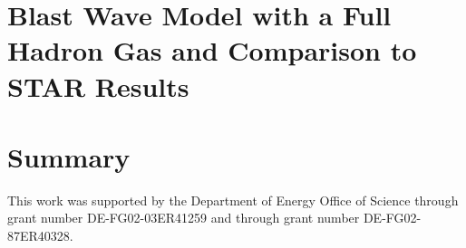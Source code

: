 \documentclass[aps,prc,nofootinbib,showpacs,superscriptaddress,groupedaddress]{revtex4-1}
\begin{document}
%


\section{Blast Wave Model with a Full Hadron Gas and Comparison to STAR Results}\label{sec:blast}



\section{Summary}\label{sec:summary}

\begin{acknowledgments}
This work was supported by the Department of Energy Office of Science through grant number DE-FG02-03ER41259 and through grant number DE-FG02-87ER40328. 
\end{acknowledgments}
\end{document}
